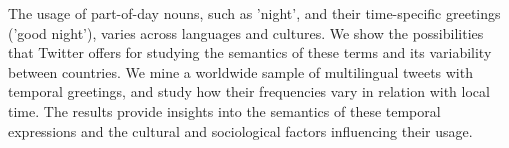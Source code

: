 The usage of part-of-day nouns, such as 'night', and their time-specific greetings ('good night'), varies across languages and cultures. We show the possibilities that Twitter offers for studying the semantics of these terms and its variability between countries. We mine a worldwide sample of multilingual tweets with temporal greetings, and study how their frequencies vary in relation with local time. The results provide insights into the semantics of these temporal expressions and the cultural and sociological factors influencing their usage.
